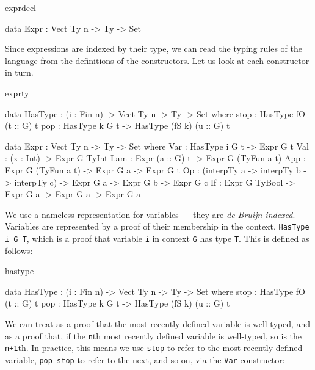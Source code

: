 \begin{SaveVerbatim}{exprdecl}

data Expr : Vect Ty n -> Ty -> Set

\end{SaveVerbatim}

\noindent
Since expressions are indexed by their type, we can read the typing rules of
the language from the definitions of the constructors. Let us look at each
constructor in turn.

\begin{SaveVerbatim}{exprty}

data HasType : (i : Fin n) -> Vect Ty n -> Ty -> Set where
    stop : HasType fO (t :: G) t
    pop  : HasType k G t -> HasType (fS k) (u :: G) t

data Expr : Vect Ty n -> Ty -> Set where
    Var : HasType i G t -> Expr G t
    Val : (x : Int) -> Expr G TyInt
    Lam : Expr (a :: G) t -> Expr G (TyFun a t)
    App : Expr G (TyFun a t) -> Expr G a -> Expr G t
    Op  : (interpTy a -> interpTy b -> interpTy c) -> Expr G a -> Expr G b -> 
          Expr G c
    If  : Expr G TyBool -> Expr G a -> Expr G a -> Expr G a
  
\end{SaveVerbatim}

\noindent
We use a nameless representation for variables --- they are \emph{de Bruijn indexed}.
Variables are represented by a proof of their membership in the context, 
\texttt{HasType i G T}, which is a proof that variable \texttt{i} in context 
\texttt{G} has type \texttt{T}. This is defined as follows:

\begin{SaveVerbatim}{hastype}

data HasType : (i : Fin n) -> Vect Ty n -> Ty -> Set where
    stop : HasType fO (t :: G) t
    pop  : HasType k G t -> HasType (fS k) (u :: G) t

\end{SaveVerbatim}

\noindent
We can treat  as a proof that the most recently defined variable is well-typed,
and  as a proof that, if the \texttt{n}th most recently defined variable is
well-typed, so is the \texttt{n+1}th. In practice, this means we use \texttt{stop} to
refer to the most recently defined variable, \texttt{pop stop} to refer to the next, and so on,
via the \texttt{Var} constructor:

